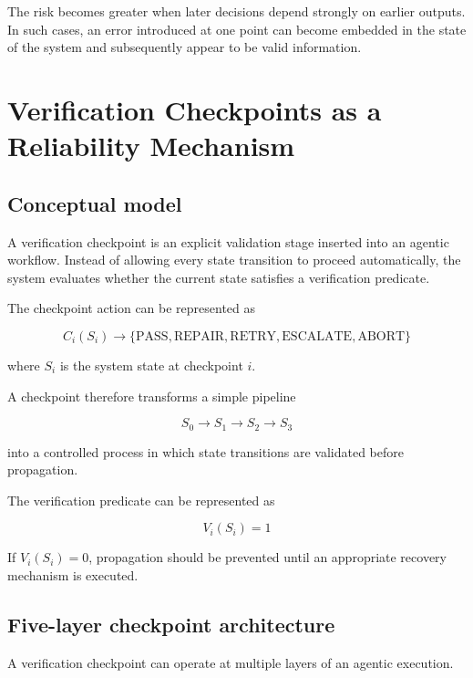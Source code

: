 \documentclass[12pt]{article}
\begin{document}
The risk becomes greater when later decisions depend strongly on earlier
outputs. In such cases, an error introduced at one point can become embedded in
the state of the system and subsequently appear to be valid information.

\section{Verification Checkpoints as a Reliability Mechanism}
\label{sec:checkpoint-mechanism}

\subsection{Conceptual model}
\label{sec:conceptual-model}

A verification checkpoint is an explicit validation stage inserted into an
agentic workflow. Instead of allowing every state transition to proceed
automatically, the system evaluates whether the current state satisfies a
verification predicate.

The checkpoint action can be represented as

\begin{equation}
C_i(S_i)
\rightarrow
\{\text{PASS},\text{REPAIR},\text{RETRY},\text{ESCALATE},\text{ABORT}\}
\label{eq:checkpoint-actions}
\end{equation}

where $S_i$ is the system state at checkpoint $i$.

A checkpoint therefore transforms a simple pipeline

\[
S_0 \rightarrow S_1 \rightarrow S_2 \rightarrow S_3
\]

into a controlled process in which state transitions are validated before
propagation.

The verification predicate can be represented as

\begin{equation}
V_i(S_i)=1
\label{eq:verification-predicate}
\end{equation}

If $V_i(S_i)=0$, propagation should be prevented until an appropriate recovery
mechanism is executed.

\subsection{Five-layer checkpoint architecture}
\label{sec:five-layer}

A verification checkpoint can operate at multiple layers of an agentic
execution.
\end{document}
